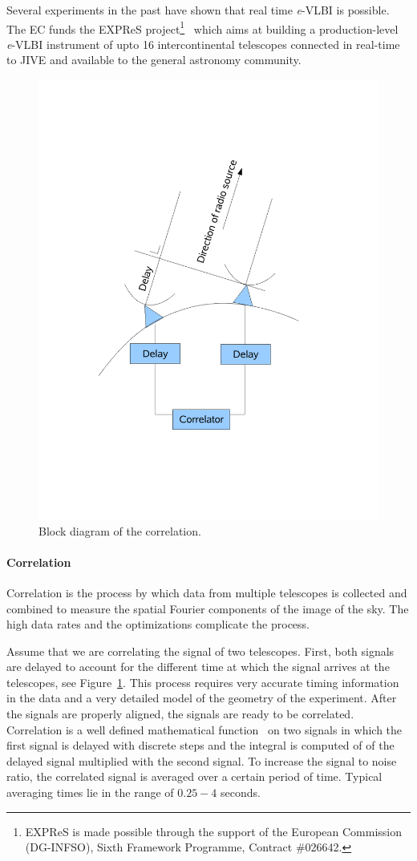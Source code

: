 Several experiments in the past have shown that real time {\it e}-VLBI
is possible. The EC funds the EXPReS project\footnote{EXPReS is made
  possible through the support of the European Commission (DG-INFSO),
  Sixth Framework Programme, Contract \#026642.}~\cite{EXPReS} which
aims at building a production-level {\it e}-VLBI instrument of upto 16
intercontinental telescopes connected in real-time to JIVE and
available to the general astronomy community.

\begin{figure}
  \centering
  \includegraphics[width=.5\textwidth]
  {img/VLBI}
  \caption{Block diagram of the correlation.}
  \label{fig:correlation_diagram}
\end{figure}
\paragraph{Correlation}
Correlation is the process by which data from multiple telescopes is
collected and combined to measure the spatial Fourier components of
the image of the sky. The high data rates and the optimizations
complicate the process.

Assume that we are correlating the signal of two telescopes. First,
both signals are delayed to account for the different time at which
the signal arrives at the telescopes, see
Figure~\ref{fig:correlation_diagram}.  This process requires very
accurate timing information in the data and a very detailed model of
the geometry of the experiment. After the signals are properly
aligned, the signals are ready to be correlated. Correlation is a well
defined mathematical function~\cite{def_correlation} on two signals in
which the first signal is delayed with discrete steps and the integral
is computed of of the delayed signal multiplied with the second
signal. To increase the signal to noise ratio, the correlated signal
is averaged over a certain period of time. Typical averaging times lie
in the range of $0.25-4$ seconds.

